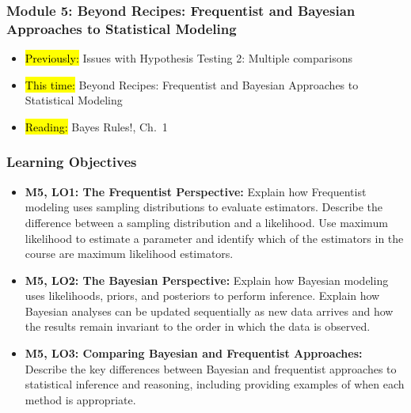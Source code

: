 
\begin{frame}
    \frametitle{Module 5: Beyond Recipes: Frequentist and Bayesian Approaches to Statistical Modeling}
    \begin{itemize}
        \item \hl{Previously: }Issues with Hypothesis Testing 2: Multiple comparisons
        \item \hl{This time: }Beyond Recipes: Frequentist and Bayesian Approaches to Statistical Modeling
        \item \hl{Reading: }Bayes Rules!, Ch.\ 1
    \end{itemize}

\end{frame}
\begin{frame}
    \frametitle{Learning Objectives}
    \begin{itemize}
        \item \textbf{M5, LO1: The Frequentist Perspective:} Explain how Frequentist modeling uses sampling distributions to evaluate estimators. Describe the difference between a sampling distribution and a likelihood. Use maximum likelihood to estimate a parameter and identify which of the estimators in the course are maximum likelihood estimators.
        \item \textbf{M5, LO2: The Bayesian Perspective:} Explain how Bayesian modeling uses likelihoods, priors, and posteriors to perform inference. Explain how Bayesian analyses can be updated sequentially as new data arrives and how the results remain invariant to the order in which the data is observed.
        \item \textbf{M5, LO3: Comparing Bayesian and Frequentist Approaches:} Describe the key differences between Bayesian and frequentist approaches to statistical inference and reasoning, including providing examples of when each method is appropriate.
    \end{itemize}
\end{frame}
